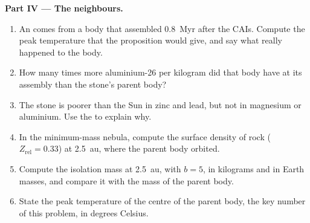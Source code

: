 \begin{problem}
\noindent\textbf{Part IV --- The neighbours.}
\begin{enumerate}[resume]
  \item An  comes from a body that assembled \qty{0.8}{Myr} after the
        CAIs. Compute the peak temperature that the proposition would give, and say
        what really happened to the body.
  \item How many times more aluminium-26 per kilogram did that body have at its
        assembly than the stone's parent body?
  \item The stone is poorer than the Sun in zinc and lead, but not in magnesium or
        aluminium. Use the  to explain why.
  \item In the minimum-mass nebula, compute the surface density of rock
        ($Z_{\mathrm{rel}} = 0.33$) at \qty{2.5}{au}, where the parent body
        orbited.
  \item Compute the isolation mass at \qty{2.5}{au}, with $b = 5$, in kilograms and
        in Earth masses, and compare it with the mass of the parent body.
  \item State the peak temperature of the centre of the parent body, the key number
        of this problem, in degrees Celsius.
\end{enumerate}
\end{problem}
